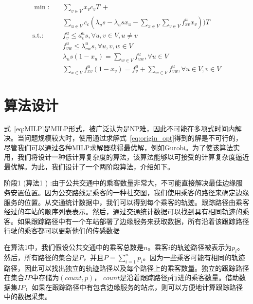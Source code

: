 \begin{equation}
\begin{aligned}
\min: &\quad \sum_{v\in V}x_v c_vT \ + \\&\quad \sum_{u\in V}c_c(\lambda_u s -  \lambda_u s x_u - \sum_{x\in V}\sum_{v\in V}f^u_{xv} x_v ))T \\
\text{s.t.:} &\quad  f^u_v \leq d^u_v s, \forall u, v\in V, u\neq v\\
&\quad f^u_{vw} \leq \lambda^u_{vw} s, \forall u, v, w \in V \\
&\quad \lambda_u s (1 - x_u) = \sum_{w\in V}f^u_{uw}, \forall u\in V\\
&\quad \sum_{x\in V}f^u_{xv} (1-x_v) = f^u_v + \sum_{w\in V}f^u_{vw}, \forall u\in V, v\in V
\end{aligned}
\label{eq:MILP}
\end{equation}



\section{算法设计}

式~\eqref{eq:MILP}是MILP形式，被广泛认为是NP难，因此不可能在多项式时间内解决。当问题规模较大时，使用通过求解式~\eqref{eq:origin_opt}得到的解是不可行的，尽管我们可以通过各种MILP求解器获得最优解，例如Gurobi。为了使该算法实用，我们将设计一种低计算复杂度的算法，该算法能够以可接受的计算复杂度逼近最优解。为此，我们设计了一个两阶段算法，介绍如下。

阶段1 (算法1 ) :由于公共交通中的乘客数量非常大，不可能直接解决最佳边缘服务安置位置。因为公交路线是乘客的一种社交图，我们使用乘客的路径来确定边缘服务的位置。从交通统计数据中，我们可以得到每个乘客的轨迹。跟踪路径由乘客经过的车站的顺序列表表示。然后，通过交通统计数据可以找到具有相同轨迹的乘客。如果跟踪路径中有一个车站部署了边缘服务来获取数据，所有沿着该跟踪路径行驶的乘客都可以更新他们的传感数据

在算法1中，我们假设公共交通中的乘客总数是$n$。乘客$i$的轨迹路径被表示为$p_i$。然后，所有路径的集合是$P$，并且$P = \sum_{i = 1}^{n}{p_i}$。因为一些乘客可能有相同的轨迹路径，因此可以找出独立的轨迹路径以及每个路径上的乘客数量。独立的跟踪路径在集合$IP$中存储为$(count, p)$， $count$是沿着跟踪路径$p$行进的乘客数量。借助数据集$IP$，如果在跟踪路径中有包含边缘服务的站点，则可以方便地计算跟踪路径中的数据采集。

